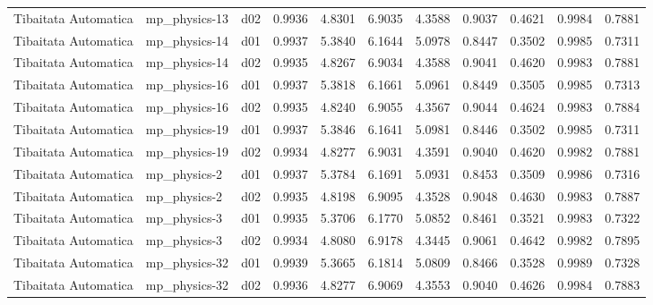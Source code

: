 \begin{longtable}{lllrrrrrrrr}
 Tibaitata Automatica  &         mp\_physics-13 &     d02 &   0.9936 &   4.8301 &   6.9035 &       4.3588 &        0.9037 &       0.4621 &           0.9984 &  0.7881 \\
 Tibaitata Automatica  &         mp\_physics-14 &     d01 &   0.9937 &   5.3840 &   6.1644 &       5.0978 &        0.8447 &       0.3502 &           0.9985 &  0.7311 \\
 Tibaitata Automatica  &         mp\_physics-14 &     d02 &   0.9935 &   4.8267 &   6.9034 &       4.3588 &        0.9041 &       0.4620 &           0.9983 &  0.7881 \\
 Tibaitata Automatica  &         mp\_physics-16 &     d01 &   0.9937 &   5.3818 &   6.1661 &       5.0961 &        0.8449 &       0.3505 &           0.9985 &  0.7313 \\
 Tibaitata Automatica  &         mp\_physics-16 &     d02 &   0.9935 &   4.8240 &   6.9055 &       4.3567 &        0.9044 &       0.4624 &           0.9983 &  0.7884 \\
 Tibaitata Automatica  &         mp\_physics-19 &     d01 &   0.9937 &   5.3846 &   6.1641 &       5.0981 &        0.8446 &       0.3502 &           0.9985 &  0.7311 \\
 Tibaitata Automatica  &         mp\_physics-19 &     d02 &   0.9934 &   4.8277 &   6.9031 &       4.3591 &        0.9040 &       0.4620 &           0.9982 &  0.7881 \\
 Tibaitata Automatica  &          mp\_physics-2 &     d01 &   0.9937 &   5.3784 &   6.1691 &       5.0931 &        0.8453 &       0.3509 &           0.9986 &  0.7316 \\
 Tibaitata Automatica  &          mp\_physics-2 &     d02 &   0.9935 &   4.8198 &   6.9095 &       4.3528 &        0.9048 &       0.4630 &           0.9983 &  0.7887 \\
 Tibaitata Automatica  &          mp\_physics-3 &     d01 &   0.9935 &   5.3706 &   6.1770 &       5.0852 &        0.8461 &       0.3521 &           0.9983 &  0.7322 \\
 Tibaitata Automatica  &          mp\_physics-3 &     d02 &   0.9934 &   4.8080 &   6.9178 &       4.3445 &        0.9061 &       0.4642 &           0.9982 &  0.7895 \\
 Tibaitata Automatica  &         mp\_physics-32 &     d01 &   0.9939 &   5.3665 &   6.1814 &       5.0809 &        0.8466 &       0.3528 &           0.9989 &  0.7328 \\
 Tibaitata Automatica  &         mp\_physics-32 &     d02 &   0.9936 &   4.8277 &   6.9069 &       4.3553 &        0.9040 &       0.4626 &           0.9984 &  0.7883 \\

\end{longtable}
